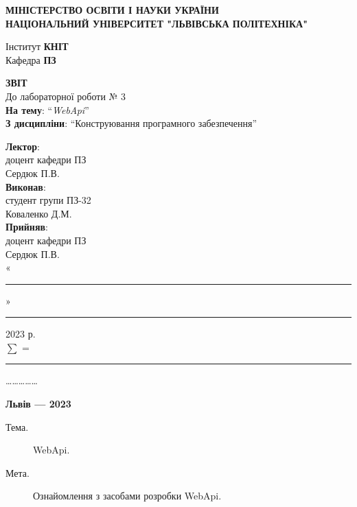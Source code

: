 \documentclass[14pt]{extreport}
\newcommand\subject{Конструювання програмного забезпечення}
\newcommand\lecturer{доцент кафедри ПЗ\\Сердюк П.В.}
\newcommand\teacher{доцент кафедри ПЗ\\Сердюк П.В.}
\newcommand\mygroup{ПЗ-32}
\newcommand\lab{3}
\newcommand\theme{WebApi}
\newcommand\purpose{Ознайомлення з засобами розробки WebApi}
\begin{document}
\begin{normalsize}
	\begin{titlepage}
		\thispagestyle{empty}
		\begin{center}
			\textbf{МІНІСТЕРСТВО ОСВІТИ І НАУКИ УКРАЇНИ\\
				НАЦІОНАЛЬНИЙ УНІВЕРСИТЕТ "ЛЬВІВСЬКА ПОЛІТЕХНІКА"}
		\end{center}
		\begin{flushright}
			Інститут \textbf{КНІТ}\\
			Кафедра \textbf{ПЗ}
		\end{flushright}
		\vspace{200pt}
		\begin{center}
			\textbf{ЗВІТ}\\
			\vspace{10pt}
			До лабораторної роботи № \lab\\
			\textbf{На тему}: “\textit{\theme}”\\
			\textbf{З дисципліни}: “\subject”
		\end{center}
		\vspace{40pt}
		\begin{flushright}
			
			\textbf{Лектор}:\\
			\lecturer\\
			\vspace{10pt}
			\textbf{Виконав}:\\
			
			студент групи \mygroup\\
			Коваленко Д.М.\\
			\vspace{10pt}
			\textbf{Прийняв}:\\
			
			\teacher\\
			
			\vspace{28pt}
			«\rule{1cm}{0.15mm}» \rule{1.5cm}{0.15mm} 2023 р.\\
			$\sum$ = \rule{1cm}{0.15mm}……………\\
			
		\end{flushright}
		\vspace{\fill}
		\begin{center}
			\textbf{Львів — 2023}
		\end{center}
	\end{titlepage}
		
	\begin{description}
		\item[Тема.] \theme.
		\item[Мета.] \purpose.
	\end{description}


\end{normalsize}
\end{document}
